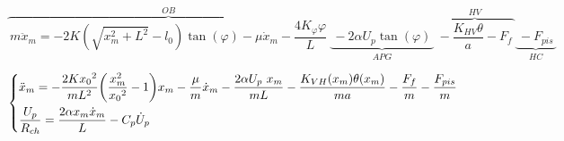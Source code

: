 \documentclass[3p,twocolumn,preprint]{elsarticle}
\begin{document}
\begin{figure}
\begin{equation}
\overbrace{\ m \ddot{x}_m =-2K(\sqrt{x_m^2+L^2}-l_0)\tan(\varphi) 
							-\mu \dot{x}_m
							-\frac{4K_{\varphi}\varphi}{L}\ }^{OB}
			\underbrace{\ -2\alpha U_p \tan(\varphi)\ }_{APG}		 
			\overbrace{\ -\dfrac{K_{HV}\theta}{a} - F_f\ }^{HV}
			\underbrace{\ -F_{pis}\ }_{HC}
\label{eq:OB-GPA}
\end{equation}
\end{figure}
\begin{figure}
\begin{equation}
	\begin{dcases}
\ddot{x}_m = - \frac{2K{x_0}^2}{mL^2}\biggl(\frac{x_m^2}{{x_0}^2} -1\biggr)
			   x_m - \frac{\mu}{m}\dot{x}_m - \frac{2\alpha U_p\ x_m}{mL}
			-\frac{K_{VH}(x_m)\theta(x_m)}{ma}
			-\frac{F_f}{m}
			-\frac{F_{pis}}{m} \\
\dfrac{U_p}{R_{ch}} = \frac{2\alpha x_m \dot{x}_m}{L} - C_p\dot{U}_p
	\end{dcases}
	\label{eq:OB+GPA+VH+piston}	
\end{equation}
\end{figure}
\end{document}
